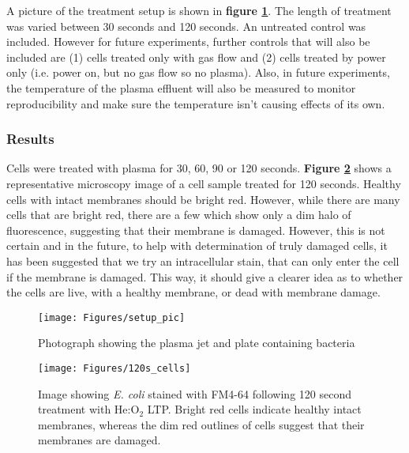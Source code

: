 \documentclass[11pt, oneside]{article}   	%
\newcommand{\todo}[1]{ \textcolor{red}{\bf{To Do:} #1}}
\begin{document}
A picture of the treatment setup is shown in \textbf{figure \ref{fig:setup_pic}}.
The length of treatment was varied between 30 seconds and 120 seconds.
An untreated control was included. 
However for future experiments, further controls that will also be included are (1) cells treated only with gas flow and (2)
cells treated by power only (i.e. power on, but no gas flow so no plasma).
Also, in future experiments, the temperature of the plasma effluent will also be measured to monitor reproducibility and make sure the temperature isn't causing effects of its own.

\subsubsection{Results}
Cells were treated with plasma for 30, 60, 90 or 120 seconds.
\textbf{Figure \ref{fig:results}} shows a representative microscopy image of a cell sample treated for 120 seconds.
Healthy cells with intact membranes should be bright red.
However, while there are many cells that are bright red, there are a few which show only a dim halo of fluorescence, suggesting that their membrane is damaged.
However, this is not certain and in the future, to help with determination of truly damaged cells, it has been suggested that we try an intracellular stain, that can only enter the cell if the membrane is damaged.
This way, it should give a clearer idea as to whether the cells are live, with a healthy membrane, or dead with membrane damage.






\begin{figure}
\centering
\texttt{[image: Figures/setup\_pic]}
\caption{Photograph showing the plasma jet and plate containing bacteria}
\label{fig:setup_pic}
\end{figure}

\begin{figure}
\centering
\texttt{[image: Figures/120s\_cells]}
\caption{Image showing \textit{E. coli} stained with FM4-64 following 120 second treatment with He:O$_2$ LTP. Bright red cells indicate healthy intact membranes, whereas the dim red outlines of cells suggest that their membranes are damaged.}
\label{fig:results}
\end{figure}
\end{document}
